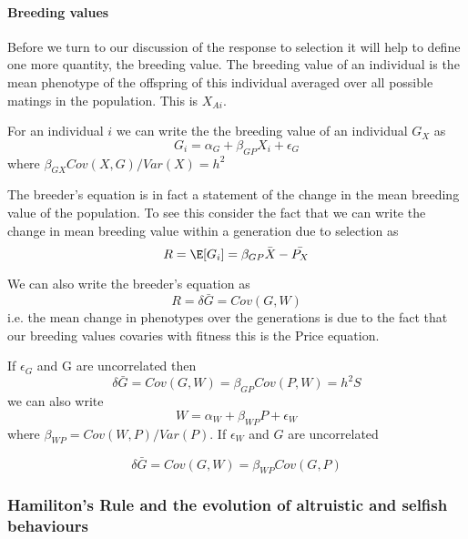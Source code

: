 \paragraph{Breeding values}

Before we turn to our discussion of the response to selection it will
help to define one more quantity, the breeding value. 
The breeding value of an individual is the mean phenotype of the
offspring of this individual averaged over all possible matings in the
population. This is $X_{Ai}$.

For an individual $i$ we can write the the breeding value of an individual $G_X$ as
\begin{equation}
G_i = \alpha_G + \beta_{GP} X_i   +\epsilon_G %
\end{equation}
where $\beta_{GX}  Cov(X,G)/Var(X) =h^2$ 


The breeder's equation is in fact a statement of the change in the mean
breeding value of the population. To see this consider the fact that
we can write the change in mean breeding value within a generation due
to selection as 
\begin{equation}
R=\E[G_i] = \beta_{GP} \bar{X_{}}-\bar{P_X}
\end{equation}

We can also write the breeder's equation as 
\begin{equation} 
R =\delta \bar{G} = Cov(G,W)
\end{equation}
i.e. the mean change in phenotypes over the generations is due to the
fact that our breeding values covaries with fitness 
this is the Price equation. 

If  $\epsilon_G$ and G are uncorrelated then
\begin{equation}
\delta \bar{G} = Cov(G,W) = \beta_{GP} Cov(P,W) = h^2 S
\end{equation}
we can also write
\begin{equation}
W = \alpha_W + \beta_{WP} P +\epsilon_W
\end{equation}
where $\beta_{WP} = Cov(W,P)/Var(P)$. If $\epsilon_W$ and $G$ are uncorrelated

\begin{equation}
\delta \bar{G} = Cov(G,W) = \beta_{WP} Cov(G,P) 
\end{equation}


\subsubsection{Hamiliton's Rule and the evolution of altruistic and
  selfish behaviours}

